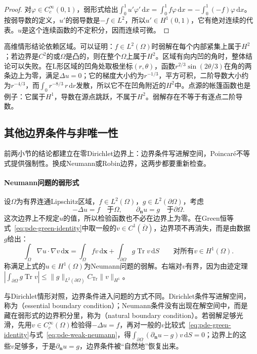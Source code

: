 \begin{proof}
对$\varphi\in C_c^\infty(0,1)$，弱形式给出$\int_0^1u'\varphi'\,\mathrm dx=\int_0^1f\varphi\,\mathrm dx=-\int_0^1(-f)\varphi\,\mathrm dx$。按弱导数的定义，$u'$的弱导数是$-f\in L^2$，所以$u'\in H^1(0,1)$，它有绝对连续的代表。$u$是这个连续函数的不定积分，因而连续可微。
\end{proof}

高维情形结论依赖区域。可以证明：$f\in L^2(\Omega)$时弱解在每个内部紧集上属于$H^2$；若边界是$C^2$的或$\Omega$是凸的，则在整个$\Omega$上属于$H^2$。区域有向内凹的角时，整体结论可以失败。在L形区域的凹角处取极坐标$(r,\theta)$，函数$r^{2/3}\sin(2\theta/3)$在角的两条边上为零，满足$\Delta u=0$；它的梯度大小约为$r^{-1/3}$，平方可积，二阶导数大小约为$r^{-4/3}$，而$\int_0r^{-8/3}\,r\,\mathrm dr$发散，所以它不在凹角附近的$H^2$中。点源的帐篷函数也是例子：它属于$H^1$，导数在源点跳跃，不属于$H^2$。弱解存在不等于有逐点二阶导数。

\subsection{其他边界条件与非唯一性}
\label{sec:pde-other-boundary}

前两小节的结论都建立在零Dirichlet边界上：边界条件写进解空间，Poincaré不等式提供强制性。换成Neumann或Robin边界，这两步都要重新检查。

\paragraph{Neumann问题的弱形式}
设$\Omega$为有界连通Lipschitz区域，$f\in L^2(\Omega)$，$g\in L^2(\partial\Omega)$，考虑
\[
  -\Delta u=f\quad\text{于}\Omega,\qquad\partial_{\bm n}u=g\quad\text{于}\partial\Omega .
\]
这次边界上不规定$u$的值，所以检验函数也不必在边界上为零。在Green恒等式~\eqref{eq:pde-green-identity}中取一般的$v\in C^1(\overline\Omega)$，边界项不再消失，而是由数据$g$给出：
\begin{equation}
  \int_\Omega\nabla u\cdot\nabla v\,\mathrm d\bm x=\int_\Omega fv\,\mathrm d\bm x+\int_{\partial\Omega}g\operatorname{Tr}v\,\mathrm dS\qquad\text{对所有}v\in H^1(\Omega).
  \label{eq:pde-weak-neumann}
\end{equation}
称满足上式的$u\in H^1(\Omega)$为Neumann问题的弱解。右端对$v$有界，因为由迹定理$|\int_{\partial\Omega}g\operatorname{Tr}v|\leq\|g\|_{L^2(\partial\Omega)}C_{\mathrm{Tr}}\|v\|_{H^1}$。

与Dirichlet情形对照，边界条件进入问题的方式不同。Dirichlet条件写进解空间，称为（essential boundary condition）；Neumann条件没有出现在解空间中，而是藏在弱形式的边界积分里，称为（natural boundary condition）。若弱解足够光滑，先用$v\in C_c^\infty(\Omega)$检验得$-\Delta u=f$，再对一般的$v$比较式~\eqref{eq:pde-green-identity}与式~\eqref{eq:pde-weak-neumann}，得$\int_{\partial\Omega}(\partial_{\bm n}u-g)v\,\mathrm dS=0$；边界上的这些$v$足够多，于是$\partial_{\bm n}u=g$，边界条件被“自然地”恢复出来。

